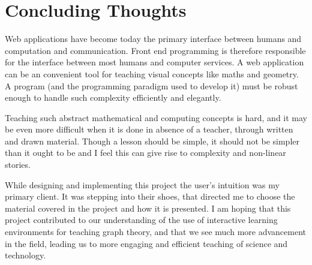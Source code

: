 \section{Concluding Thoughts}

Web applications have become today the primary interface between humans and
computation and communication. Front end programming is therefore responsible
for the interface between most humans and computer services. A web
application can be an convenient tool for teaching visual concepts like maths
and geometry. A program (and the programming paradigm used to develop it) must be robust enough to
handle such complexity efficiently and elegantly. 

Teaching such abstract mathematical and computing concepts is hard, and it may be even more difficult when it is done in absence of a teacher, through written and drawn material. Though a lesson should be simple, it should not
be simpler than it ought to be and I feel this can give rise to complexity and non-linear
stories. 

While designing and implementing this project the user's intuition was my
primary client. It was stepping into their shoes, that directed me to choose the material covered in the project and how it is presented. I am hoping that this project contributed to our understanding of the use of interactive learning environments for teaching graph theory, and that we see much more advancement in the field, leading us to more engaging and efficient teaching of science and technology.
